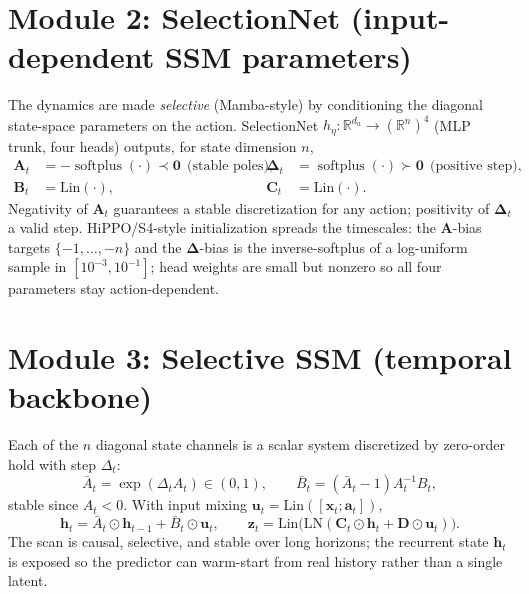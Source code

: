\documentclass[11pt]{article}
\newcommand{\R}{\mathbb{R}}
\newcommand{\xv}{\mathbf{x}}
\newcommand{\zv}{\mathbf{z}}
\newcommand{\av}{\mathbf{a}}
\newcommand{\hv}{\mathbf{h}}
\newcommand{\uv}{\mathbf{u}}
\newcommand{\softplus}{\operatorname{softplus}}
\begin{document}
\section{Module 2: SelectionNet (input-dependent SSM parameters)}\label{sec:selection}

The dynamics are made \emph{selective} (Mamba-style) by conditioning the diagonal state-space
parameters on the action. SelectionNet $h_\eta:\R^{d_a}\!\to(\R^{n})^4$ (MLP trunk, four heads)
outputs, for state dimension $n$,
\begin{align}
\mathbf{A}_t &= -\softplus(\cdot)\prec\mathbf 0 \ \ \text{(stable poles)}, &
\bm{\Delta}_t &= \softplus(\cdot)\succ\mathbf 0 \ \ \text{(positive step)}, \\
\mathbf{B}_t &= \mathrm{Lin}(\cdot), & \mathbf{C}_t &= \mathrm{Lin}(\cdot).
\end{align}
Negativity of $\mathbf A_t$ guarantees a stable discretization for any action; positivity of
$\bm\Delta_t$ a valid step. HiPPO/S4-style initialization spreads the timescales: the $\mathbf A$-bias
targets $\{-1,\dots,-n\}$ and the $\bm\Delta$-bias is the inverse-softplus of a log-uniform sample in
$[10^{-3},10^{-1}]$; head weights are small but nonzero so all four parameters stay action-dependent.

\section{Module 3: Selective SSM (temporal backbone)}\label{sec:ssm}

Each of the $n$ diagonal state channels is a scalar system discretized by zero-order hold with step
$\Delta_t$:
\begin{equation}
\bar A_t=\exp(\Delta_t A_t)\in(0,1),\qquad \bar B_t=(\bar A_t-1)A_t^{-1}B_t,
\end{equation}
stable since $A_t<0$. With input mixing $\uv_t=\mathrm{Lin}([\xv_t;\av_t])$,
\begin{equation}
\hv_t=\bar A_t\odot\hv_{t-1}+\bar B_t\odot\uv_t,\qquad
\zv_t=\mathrm{Lin}\big(\mathrm{LN}(\mathbf C_t\odot\hv_t+\mathbf D\odot\uv_t)\big).
\end{equation}
The scan is causal, selective, and stable over long horizons; the recurrent state $\hv_t$ is exposed
so the predictor can warm-start from real history rather than a single latent.

\end{document}
